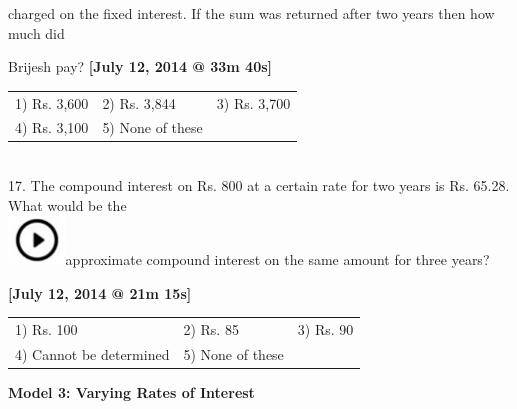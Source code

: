 \documentclass{article}
\begin{document}
	\noindent charged on the fixed interest. If the sum was returned after two years then how much did
	
	\noindent 
	
	\noindent Brijesh pay?           \textbf{[July 12, 2014 @ 33m 40s]}
	
	\noindent 
	
	\noindent \begin{tabular}{p{1.7in} p{1.6in} p{1.6in}} \\ 
 1) Rs. 3,600                &  2) Rs. 3,844         &  3) Rs. 3,700         \\
4) Rs. 3,100         & 5) None of these  \\
\end{tabular}
	
	\noindent 
	
	\noindent 
	
	\noindent \\  
	
	17. The compound interest on Rs. 800 at a certain rate for two years is Rs. 65.28. What would be the  
\noindent \\ \includegraphics*[width=0.60in, height=0.52in]{images/image1}approximate compound interest on the same amount for three years?
	
	\noindent \textbf{[July 12, 2014 @ 21m 15s]}
	
	\noindent 
	
	\noindent \begin{tabular}{p{1.7in} p{1.6in} p{1.6in}} \\ 
 1) Rs. 100                                                          &  2) Rs. 85                                        &  3) Rs. 90
	
	\noindent 
	
	\noindent \\
4) Cannot be determined                            & 5) None of these  \\
\end{tabular}
	
	\noindent 
	
	\noindent 
	
	\noindent \textbf{Model 3: Varying Rates of Interest}
	
	\noindent 
	
	\noindent 
	
\end{document}
